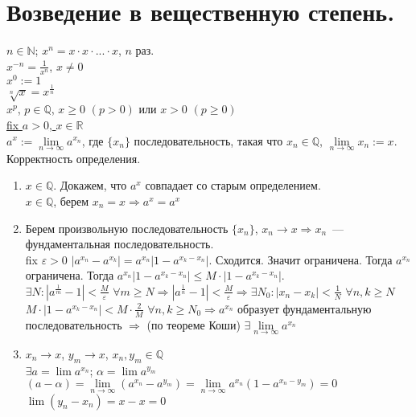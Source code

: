 \documentclass{article}
\begin{document}
	\section{Возведение в вещественную степень.}
	$n \in \mathbb{N}$; $x^n = x \cdot x \cdot ... \cdot x$, $n$ раз. \\
	$x^{-n} = \frac{1}{x^n}$, $x \not= 0$ \\
	$x^0 := 1$ \\
	$\sqrt[n]{x} = x^{\frac{1}{n}}$ \\
	$x^p$, $p \in \mathbb{Q}$, $x \geqslant 0$ $(p > 0)$ или $x > 0$ $(p \geqslant 0)$ \\
	\underline{fix $a > 0$, $x \in \mathbb{R}$} \\
	$a^x := \lim \limits_{n \rightarrow \infty} a^{x_n}$, где $\{x_n\}$ последовательность, такая что $x_n \in \mathbb{Q}$, $\lim \limits_{n \rightarrow \infty} x_n := x$. \\
	Корректность определения.
	\begin{enumerate}
		\item $x \in \mathbb{Q}$. Докажем, что $a^x$ совпадает со старым определением. \\
		$x \in \mathbb{Q}$, берем $x_n = x \Rightarrow a^x = a^x$
		\item Берем произвольную последовательность $\{x_n\}$, $x_n \rightarrow x \Rightarrow x_n$~--- фундаментальная последовательность. \\
		fix $\varepsilon > 0$ $|a^{x_n} - a^{x_k}| = a^{x_n}|1 - a^{x_k - x_n}|$. Сходится. Значит ограничена. Тогда $a^{x_n}$ ограничена. Тогда $a^{x_n}|1 - a^{x_k - x_n}| \leqslant M \cdot |1 - a^{x_k - x_n}|$. \\
		$\exists N: |a^{\frac{1}{m}} - 1| < \frac{M}{\varepsilon}$ $\forall m \geqslant N \Rightarrow |a^{\frac{1}{n}} - 1| < \frac{M}{\varepsilon} \Rightarrow \exists N_0: |x_n - x_k| < \frac{1}{N}$ $\forall n, k \geqslant N$ \\
		$M \cdot |1 - a^{x_k - x_n}| < M \cdot \frac{2}{M}$ $\forall n, k \geqslant N_0 \Rightarrow a^{x_n}$ образует фундаментальную последовательность $\Rightarrow$ (по теореме Коши) $\exists \lim \limits_{n \rightarrow \infty} a^{x_n}$
		\item $x_n \rightarrow x$, $y_m \rightarrow x$, $x_n, y_m \in \mathbb{Q}$ \\
		$\exists a = \lim a^{x_n}$; $\alpha = \lim a^{y_m}$ \\
		$(a - \alpha) = \lim \limits_{n \rightarrow \infty} (a^{x_n} - a^{y_m}) = \lim \limits_{n \rightarrow \infty} a^{x_n} (1 - a^{x_n - y_m}) = 0$ \\
		$\lim(y_n - x_n) = x - x = 0$
	\end{enumerate}
\end{document}
